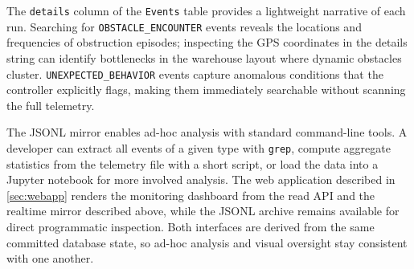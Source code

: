 The \texttt{details} column of the \texttt{Events} table provides a lightweight narrative of each run. Searching for \texttt{OBSTACLE\_ENCOUNTER} events reveals the locations and frequencies of obstruction episodes; inspecting the GPS coordinates in the details string can identify bottlenecks in the warehouse layout where dynamic obstacles cluster. \texttt{UNEXPECTED\_BEHAVIOR} events capture anomalous conditions that the controller explicitly flags, making them immediately searchable without scanning the full telemetry.

The JSONL mirror enables ad-hoc analysis with standard command-line tools. A developer can extract all events of a given type with \texttt{grep}, compute aggregate statistics from the telemetry file with a short script, or load the data into a Jupyter notebook for more involved analysis. The web application described in \cref{sec:webapp} renders the monitoring dashboard from the read API and the realtime mirror described above, while the JSONL archive remains available for direct programmatic inspection. Both interfaces are derived from the same committed database state, so ad-hoc analysis and visual oversight stay consistent with one another.
